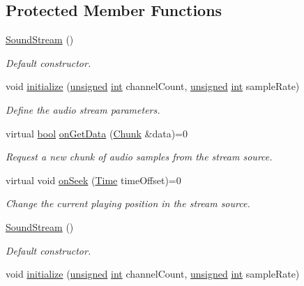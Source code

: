 \subsection*{Protected Member Functions}
\begin{DoxyCompactItemize}
\item 
\hyperlink{classsf_1_1_sound_stream_a769d08f4c3c6b4340ef3a838329d2e5c}{Sound\-Stream} ()
\begin{DoxyCompactList}\small\item\em Default constructor. \end{DoxyCompactList}\item 
void \hyperlink{classsf_1_1_sound_stream_a9c351711198ee1aa77c2fefd3ced4d2c}{initialize} (\hyperlink{curses_8priv_8h_aca40206900cfc164654362fa8d4ad1e6}{unsigned} \hyperlink{term__entry_8h_ad65b480f8c8270356b45a9890f6499ae}{int} channel\-Count, \hyperlink{curses_8priv_8h_aca40206900cfc164654362fa8d4ad1e6}{unsigned} \hyperlink{term__entry_8h_ad65b480f8c8270356b45a9890f6499ae}{int} sample\-Rate)
\begin{DoxyCompactList}\small\item\em Define the audio stream parameters. \end{DoxyCompactList}\item 
virtual \hyperlink{term__entry_8h_a002004ba5d663f149f6c38064926abac}{bool} \hyperlink{classsf_1_1_sound_stream_a968ec024a6e45490962c8a1121cb7c5f}{on\-Get\-Data} (\hyperlink{structsf_1_1_sound_stream_1_1_chunk}{Chunk} \&data)=0
\begin{DoxyCompactList}\small\item\em Request a new chunk of audio samples from the stream source. \end{DoxyCompactList}\item 
virtual void \hyperlink{classsf_1_1_sound_stream_a907036dd2ca7d3af5ead316e54b75997}{on\-Seek} (\hyperlink{classsf_1_1_time}{Time} time\-Offset)=0
\begin{DoxyCompactList}\small\item\em Change the current playing position in the stream source. \end{DoxyCompactList}\item 
\hyperlink{classsf_1_1_sound_stream_a769d08f4c3c6b4340ef3a838329d2e5c}{Sound\-Stream} ()
\begin{DoxyCompactList}\small\item\em Default constructor. \end{DoxyCompactList}\item 
void \hyperlink{classsf_1_1_sound_stream_a9c351711198ee1aa77c2fefd3ced4d2c}{initialize} (\hyperlink{curses_8priv_8h_aca40206900cfc164654362fa8d4ad1e6}{unsigned} \hyperlink{term__entry_8h_ad65b480f8c8270356b45a9890f6499ae}{int} channel\-Count, \hyperlink{curses_8priv_8h_aca40206900cfc164654362fa8d4ad1e6}{unsigned} \hyperlink{term__entry_8h_ad65b480f8c8270356b45a9890f6499ae}{int} sample\-Rate)

\end{DoxyCompactItemize}
